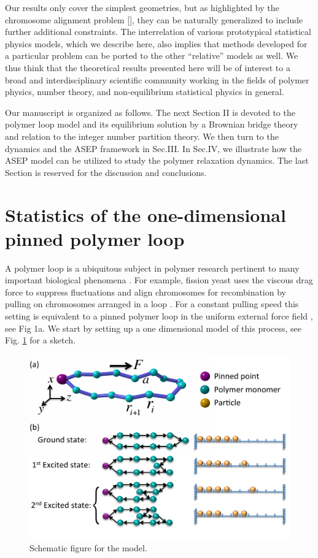 \documentclass[aps,showpacs,twocolumn,floatfix,prx,superscriptaddress]{revtex4-1}
\begin{document}
Our results only cover the simplest geometries, but as highlighted by the chromosome alignment problem [], they can be naturally generalized to include further additional constraints. The interrelation of various prototypical statistical physics models, which we describe here, also implies that methods developed for a particular problem can be ported to the other ``relative'' models as well. We thus think that the theoretical results presented here will be of interest to a broad and interdisciplinary scientific community working in the fields of polymer physics, number theory, and non-equilibrium statistical physics in general. 

Our manuscript is organized as follows. The next Section II is devoted to the polymer loop model and its equilibrium solution by a Brownian bridge theory and relation to the integer number partition theory. We then turn to the dynamics and the ASEP framework in Sec.III. In Sec.IV, we illustrate how the ASEP model can be utilized to study the polymer relaxation dynamics. The last Section is reserved for the discussion and conclusions.

\section{Statistics of the one-dimensional pinned polymer loop}
A polymer loop is a ubiquitous subject in polymer research pertinent to many
important biological phenomena \cite{}. For example, fission yeast uses the
viscous drag force to suppress fluctuations and align chromosomes for
recombination by pulling on chromosomes arranged in a loop \cite{}. For a constant
pulling speed this setting is equivalent to a pinned polymer loop in the uniform
external force field \cite{}, see Fig 1a. We start by setting up a one dimensional model of
this process, see Fig. \ref{fig:schematic} for a sketch.
\begin{figure}[htpb]
    \centering
    \includegraphics[width=1.0\linewidth]{schematic}
    \caption{Schematic figure for the model.}
    \label{fig:schematic}
\end{figure}
\end{document}
